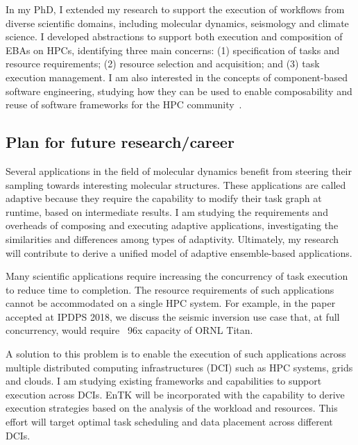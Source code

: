 In my PhD, I extended my research to support the execution of workflows from
diverse scientific domains, including molecular dynamics, seismology and
climate science. I developed abstractions to support both execution and
composition of EBAs on HPCs, identifying three main concerns: (1)
specification of tasks and resource requirements; (2) resource selection and
acquisition; and (3) task execution management. I am also interested in the
concepts of component-based software engineering, studying how they can be
used to enable composability and reuse of software frameworks
for the HPC community~\cite{review_bb_2016}.

\subsection{Plan for future research/career}

Several applications in the field of molecular dynamics benefit from steering
their sampling towards interesting molecular structures. These applications
are called adaptive because they require the capability to modify their task
graph at runtime, based on intermediate results. I am studying the requirements 
and overheads of composing and executing adaptive applications, investigating 
the similarities and differences among types of adaptivity. Ultimately, my 
research will contribute to derive a unified model of adaptive ensemble-based 
applications.

Many scientific applications require increasing the concurrency of task
execution to reduce time to completion. The resource requirements of such
applications cannot be accommodated on a single HPC system. For example, in
the paper accepted at IPDPS 2018, we discuss the seismic inversion use case
that, at full concurrency, would require ~96x capacity of ORNL Titan.

  A solution to this problem is to enable 
the execution of such applications across multiple distributed computing 
infrastructures (DCI) such as HPC systems, grids and clouds. I am studying 
existing frameworks and capabilities to support execution across DCIs. EnTK 
will be incorporated with the capability to derive execution strategies based 
on the analysis of the workload and resources. This effort will target optimal 
task scheduling and data placement across different DCIs.


